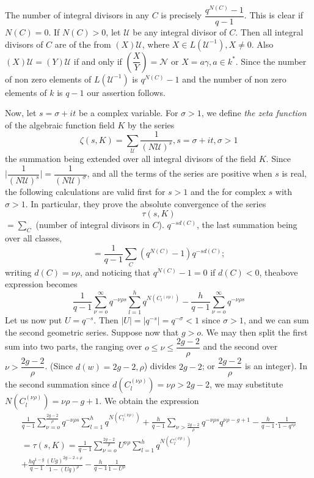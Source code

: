 \begin{remark}\label{chap10:sec21:rem2}%
  The number of integral divisors in any $C$ is precisely \break
  $\dfrac {
    q^{N(C)} -1} {q-1}$. This is clear if $N(C) = 0$. If $N(C) > 0$, let
  $\mathscr{U}$ be any integral divisor of $C$. Then all integral
  divisors of $C$ are of the from $(X) \mathscr{U}$, where $X \in L
  (\mathscr{U}^{-1}), X \neq 0$. Also $(X) \mathscr{U} = (Y)
  \mathscr{U}$ if and only if $\left(\dfrac{X}{Y}\right) =\mathscr{N}$ or $X =
  a\gamma, a \in k^*$. Since the number of non zero elements
  of $L (\mathscr{U}^{-1})$ is $q^{N (C)} -1$ and the number of non
  zero elements of $k$ is $q-1$ our assertion follows.   
\end{remark}

Now, let $s = \sigma + it$ be a complex variable. For $\sigma > 1$, we
define \textit { the zeta function} of the algebraic function field
$K$ by the series  
$$
\zeta (s, K) =\sum_\mathscr{U} \frac{1}{(N \mathscr{U})^s} , s =
\sigma + it, \sigma > 1 
$$ 
the summation being extended over all integral divisors of the field
$K$. Since $\bigg|  \dfrac{1}{ (N \mathscr{U})^s}\bigg| = \dfrac{1}{(N
  \mathscr{U})^\sigma}$, and all the terms of the series are positive
when $s$ is real, the following calculations are valid first for $s >
1$ and the for complex $s$ with $\sigma > 1$. In particular, they
prove the absolute convergence of the series     
$$
\tau (s, K)
$$
$= \sum\limits_C$ (number of integral divisors in $C$). $q^{-sd
  (C)}$, the last summation being over all classes, 
$$
= \frac{1}{q-1} \sum_{C} (q^{N (C)} - 1) q^{-sd (C)};
$$
writing $d (C) = \nu \rho$, and noticing that $q^{N (C)} -1 = 0$ if $d
(C) < 0$, the\pageoriginale above expression becomes 
$$
\frac{1}{q-1} \sum^\infty_{\nu = o} q^{- \nu \rho s} \sum^h_{l=1} q^{N
  (C_l{^{(\nu \rho)}})} - \frac{h}{q-1} \sum^\infty_{ \nu = o} q^{-
  \nu \rho s} 
$$
Let us now put $U = q^{-s}$. Then $|U| = |q^{-s}| = q^{-\sigma} < 1$
since $\sigma > 1$, and we can sum the second geometric
series. Suppose now that $g > o$. We may then split the first sum into
two parts, the ranging over $o \le \nu \le \dfrac{2g-2}{\rho}$ and the
second over $\nu > \dfrac{2g-2}{\rho}$. (Since $d(w) = 2g-2, \rho$)
divides $2g-2$; or $\dfrac{2g-2}{\rho}$ is an integer). In the second
summation since $d (C_l^{(\nu \rho )}) = \nu \rho > 2g-2$, we may
substitute $N (C_l^{(\nu \rho)}) = \nu \rho - g+1$. We obtain the
expression  
\begin{multline*}
 \frac{1}{q-1} \sum^{\frac{2g-2}{\rho}}_{\nu = o} q^{- \nu \rho s}
 \sum^h_{l=1} q^{N (C_l^{(\nu \rho)})} + \frac{h}{q-1} \sum_{ \nu >
   \frac{2g-2}{\rho}} q^{-\nu \rho s} q^{\nu \rho -g+1} -
 \frac{h}{q-1}. \frac{1}{1-q^{s \rho}}\\ 
  =\tau (s,K) = \frac{1}{q-1} \sum^{\frac{2g-2}{\rho}}_{\nu = o}
  U^{\nu \rho} \sum^h_{l=1} q^{N (C_l^{(\nu \rho)})}\\ +
  \frac{hq^{1-g}}{q-1} \frac{(Ug)^{2g-2+\rho}}{ 1-(Uq)^\rho} -
  \frac{h}{q-1} \frac{1}{1-U^\rho} \tag{1}\label{chap10:sec:21:eq1} 
\end{multline*}

